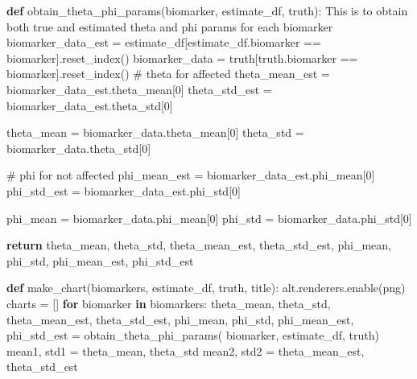 \documentclass[
  letterpaper,
  DIV=11,
  numbers=noendperiod]{scrreprt}
\newenvironment{Shaded}{\begin{snugshade}}{\end{snugshade}}
\newcommand{\CommentTok}[1]{\textcolor[rgb]{0.37,0.37,0.37}{#1}}
\newcommand{\ControlFlowTok}[1]{\textcolor[rgb]{0.00,0.23,0.31}{\textbf{#1}}}
\newcommand{\DecValTok}[1]{\textcolor[rgb]{0.68,0.00,0.00}{#1}}
\newcommand{\KeywordTok}[1]{\textcolor[rgb]{0.00,0.23,0.31}{\textbf{#1}}}
\newcommand{\NormalTok}[1]{\textcolor[rgb]{0.00,0.23,0.31}{#1}}
\newcommand{\OperatorTok}[1]{\textcolor[rgb]{0.37,0.37,0.37}{#1}}
\newcommand{\StringTok}[1]{\textcolor[rgb]{0.13,0.47,0.30}{#1}}
\begin{document}
\begin{Shaded}
\begin{Highlighting}[]
\KeywordTok{def}\NormalTok{ obtain\_theta\_phi\_params(biomarker, estimate\_df, truth):}
    \CommentTok{\textquotesingle{}\textquotesingle{}\textquotesingle{}This is to obtain both true and estimated theta and phi params for each biomarker \textquotesingle{}\textquotesingle{}\textquotesingle{}}
\NormalTok{    biomarker\_data\_est }\OperatorTok{=}\NormalTok{ estimate\_df[estimate\_df.biomarker }\OperatorTok{==}\NormalTok{ biomarker].reset\_index()}
\NormalTok{    biomarker\_data }\OperatorTok{=}\NormalTok{ truth[truth.biomarker }\OperatorTok{==}\NormalTok{ biomarker].reset\_index()}
    \CommentTok{\# theta for affected}
\NormalTok{    theta\_mean\_est }\OperatorTok{=}\NormalTok{ biomarker\_data\_est.theta\_mean[}\DecValTok{0}\NormalTok{]}
\NormalTok{    theta\_std\_est }\OperatorTok{=}\NormalTok{ biomarker\_data\_est.theta\_std[}\DecValTok{0}\NormalTok{]}

\NormalTok{    theta\_mean }\OperatorTok{=}\NormalTok{ biomarker\_data.theta\_mean[}\DecValTok{0}\NormalTok{]}
\NormalTok{    theta\_std }\OperatorTok{=}\NormalTok{ biomarker\_data.theta\_std[}\DecValTok{0}\NormalTok{]}

    \CommentTok{\# phi for not affected}
\NormalTok{    phi\_mean\_est }\OperatorTok{=}\NormalTok{ biomarker\_data\_est.phi\_mean[}\DecValTok{0}\NormalTok{]}
\NormalTok{    phi\_std\_est }\OperatorTok{=}\NormalTok{ biomarker\_data\_est.phi\_std[}\DecValTok{0}\NormalTok{]}

\NormalTok{    phi\_mean }\OperatorTok{=}\NormalTok{ biomarker\_data.phi\_mean[}\DecValTok{0}\NormalTok{]}
\NormalTok{    phi\_std }\OperatorTok{=}\NormalTok{ biomarker\_data.phi\_std[}\DecValTok{0}\NormalTok{]}

    \ControlFlowTok{return}\NormalTok{ theta\_mean, theta\_std, theta\_mean\_est, theta\_std\_est, phi\_mean, phi\_std, phi\_mean\_est, phi\_std\_est}

\KeywordTok{def}\NormalTok{ make\_chart(biomarkers, estimate\_df, truth, title):}
\NormalTok{    alt.renderers.enable(}\StringTok{\textquotesingle{}png\textquotesingle{}}\NormalTok{)}
\NormalTok{    charts }\OperatorTok{=}\NormalTok{ []}
    \ControlFlowTok{for}\NormalTok{ biomarker }\KeywordTok{in}\NormalTok{ biomarkers: }
\NormalTok{        theta\_mean, theta\_std, theta\_mean\_est, theta\_std\_est, phi\_mean, phi\_std, phi\_mean\_est, phi\_std\_est }\OperatorTok{=}\NormalTok{ obtain\_theta\_phi\_params(}
\NormalTok{        biomarker, estimate\_df, truth)}
\NormalTok{        mean1, std1 }\OperatorTok{=}\NormalTok{ theta\_mean, theta\_std}
\NormalTok{        mean2, std2 }\OperatorTok{=}\NormalTok{ theta\_mean\_est, theta\_std\_est}


\end{Highlighting}
\end{Shaded}
\end{document}
